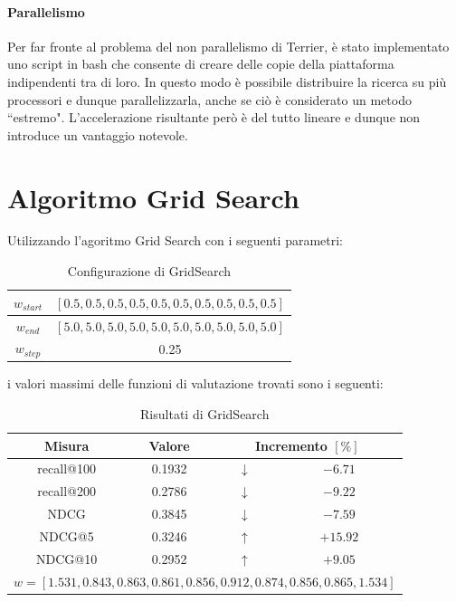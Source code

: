 \paragraph{Parallelismo}
Per far fronte al problema del non parallelismo di Terrier, è stato implementato uno
script in bash che consente di creare delle copie della piattaforma indipendenti tra di loro.
In questo modo è possibile distribuire la ricerca su più processori e dunque parallelizzarla,
anche se ciò è considerato un metodo ``estremo". L'accelerazione risultante però
è del tutto lineare e dunque non introduce un vantaggio notevole.


\section{Algoritmo Grid Search}
Utilizzando l'agoritmo Grid Search con i seguenti parametri:

\begin{table}[h!]
	\centering
	\begin{tabular}{|c|c|}
		\hline
		$w_{start}$ & $[0.5, 0.5, 0.5, 0.5, 0.5, 0.5, 0.5, 0.5, 0.5, 0.5]$ \\
		\hline
		$w_{end}$ & $[5.0, 5.0, 5.0, 5.0, 5.0, 5.0, 5.0, 5.0, 5.0, 5.0]$ \\		
		\hline
		$w_{step}$ & 0.25 \\
		\hline
	\end{tabular}
\caption{Configurazione di GridSearch}
\end{table}

i valori massimi delle funzioni di valutazione trovati sono i seguenti:

\begin{table}[h!]
	\centering
	\begin{tabular}{|c|c|c|c|}
		\hline
		\textbf{Misura} & \textbf{Valore} & \multicolumn{2}{|c|}{\textbf{Incremento} $\left[\%\right]$} \\
		\hline
		recall@100  &  0.1932 &   $\downarrow$ & $-6.71$ \\
		\hline
		recall@200   & 0.2786 & $\downarrow$ & $-9.22$ \\
		\hline
		NDCG    & 0.3845 &  $\downarrow$ & $-7.59$ \\
		\hline
		NDCG@5  & 0.3246 & $\uparrow$ & $+15.92$ \\
		\hline
		NDCG@10  & 0.2952 & $\uparrow$  & $+9.05$ \\
		\hline
		\multicolumn{4}{|c|}{$w = [1.531, 0.843, 0.863, 0.861, 0.856 , 0.912, 0.874, 0.856, 0.865, 1.534]$} \\
		\hline
	\end{tabular}
	\caption{Risultati di GridSearch}
\end{table}

